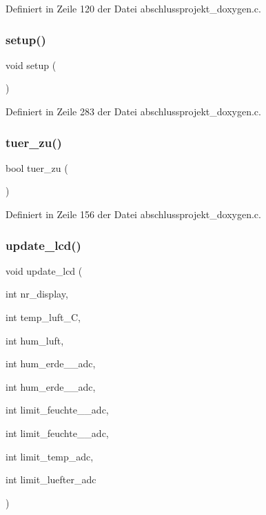 Definiert in Zeile 120 der Datei abschlussprojekt\+\_\+doxygen.\+c.

\mbox{\label{abschlussprojekt__doxygen_8c_a4fc01d736fe50cf5b977f755b675f11d}} 
\subsubsection{setup()}
{\footnotesize\ttfamily void setup (\begin{DoxyParamCaption}{ }\end{DoxyParamCaption})}



Definiert in Zeile 283 der Datei abschlussprojekt\+\_\+doxygen.\+c.

\mbox{\label{abschlussprojekt__doxygen_8c_a204dcf18a43cbaf756753c4de7bc10b4}} 
\subsubsection{tuer\+\_\+zu()}
{\footnotesize\ttfamily bool tuer\+\_\+zu (\begin{DoxyParamCaption}{ }\end{DoxyParamCaption})}



Definiert in Zeile 156 der Datei abschlussprojekt\+\_\+doxygen.\+c.

\mbox{\label{abschlussprojekt__doxygen_8c_a23904742a80994988f92b99487c299ca}} 
\subsubsection{update\+\_\+lcd()}
{\footnotesize\ttfamily void update\+\_\+lcd (\begin{DoxyParamCaption}\item[{int}]{nr\+\_\+display,  }\item[{int}]{temp\+\_\+luft\+\_\+C,  }\item[{int}]{hum\+\_\+luft,  }\item[{int}]{hum\+\_\+erde\+\_\+\_\+adc,  }\item[{int}]{hum\+\_\+erde\+\_\+\_\+adc,  }\item[{int}]{limit\+\_\+feuchte\+\_\+\_\+adc,  }\item[{int}]{limit\+\_\+feuchte\+\_\+\_\+adc,  }\item[{int}]{limit\+\_\+temp\+\_\+adc,  }\item[{int}]{limit\+\_\+luefter\+\_\+adc }\end{DoxyParamCaption})}



